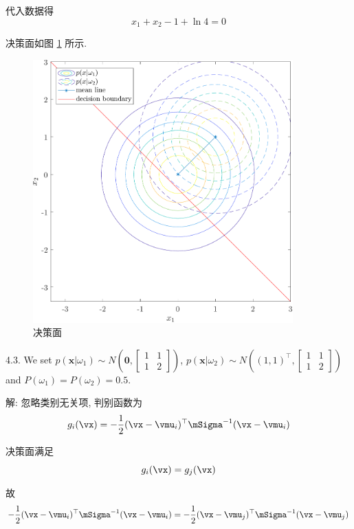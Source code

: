 \documentclass[openany]{ctexbook}
\theoremstyle{kaiti}
\theoremstyle{normal}
\begin{document}
代入数据得
\begin{equation}
  x_1+x_2-1+\ln4=0
\end{equation}

决策面如图 \ref{fig:mvnpdf-2} 所示.

\begin{figure}
  \centering
  \includegraphics[width=10cm]{mvnpdf-2.pdf}
  \caption{决策面}
  \label{fig:mvnpdf-2}
\end{figure}

4.3. We set $p(\bm{x}|\omega_1)\sim N\left(\bm{0},\begin{bmatrix} 1 & 1 \\ 1 & 2 \end{bmatrix}\right)$, $p(\bm{x}|\omega_2)\sim N\left((1,1)^{\top},\begin{bmatrix} 1 & 1 \\ 1 & 2 \end{bmatrix}\right)$ and $P(\omega_1)=P(\omega_2)=0.5$.

解: 忽略类别无关项, 判别函数为
\begin{equation}
  g_i(\vx)=-\frac{1}{2}(\vx-\vmu_i)^{\top}\mSigma^{-1}(\vx-\vmu_i)
\end{equation}

决策面满足
\begin{equation}
  g_i(\vx)=g_j(\vx)
\end{equation}

故
\begin{equation}
  -\frac{1}{2}(\vx-\vmu_i)^{\top}\mSigma^{-1}(\vx-\vmu_i)=-\frac{1}{2}(\vx-\vmu_j)^{\top}\mSigma^{-1}(\vx-\vmu_j)
\end{equation}
\end{document}
